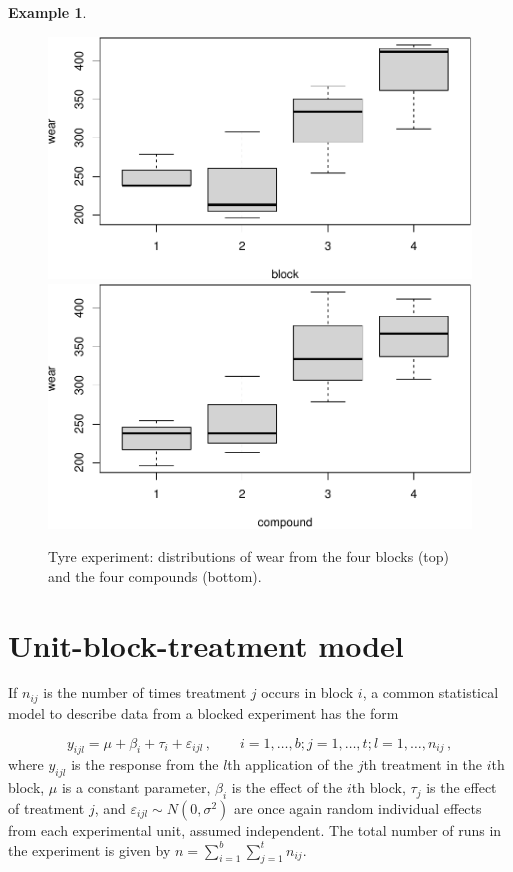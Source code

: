 \documentclass[
]{book}
\theoremstyle{definition}
\theoremstyle{definition}
\newtheorem{example}{Example}[chapter]
\theoremstyle{definition}
\theoremstyle{definition}
\theoremstyle{remark}
\begin{document}
\begin{example}
\begin{figure}
{\centering \includegraphics{bookdown_math3014-6027_files/figure-latex/tyre-expt-boxplots-1} \includegraphics{bookdown_math3014-6027_files/figure-latex/tyre-expt-boxplots-2} 

}

\caption{Tyre experiment: distributions of wear from the four blocks (top) and the four compounds (bottom).}\label{fig:tyre-expt-boxplots}
\end{figure}

\end{example}

\hypertarget{unit-block-treatment-model}{%
\section{Unit-block-treatment model}\label{unit-block-treatment-model}}

If \(n_{ij}\) is the number of times treatment \(j\) occurs in block \(i\), a common statistical model to describe data from a blocked experiment has the form

\begin{equation}
y_{ijl} = \mu + \beta_i + \tau_i + \varepsilon_{ijl}\,, \qquad i = 1,\ldots, b; j = 1, \ldots, t; l = 1,\ldots,n_{ij}\,,
\label{eq:block-model}
\end{equation}
where \(y_{ijl}\) is the response from the \(l\)th application of the \(j\)th treatment in the \(i\)th block, \(\mu\) is a constant parameter, \(\beta_i\) is the effect of the \(i\)th block, \(\tau_j\) is the effect of treatment \(j\), and \(\varepsilon_{ijl}\sim N(0, \sigma^2)\) are once again random individual effects from each experimental unit, assumed independent. The total number of runs in the experiment is given by \(n = \sum_{i=1}^b\sum_{j=1}^t n_{ij}\).
\end{document}
